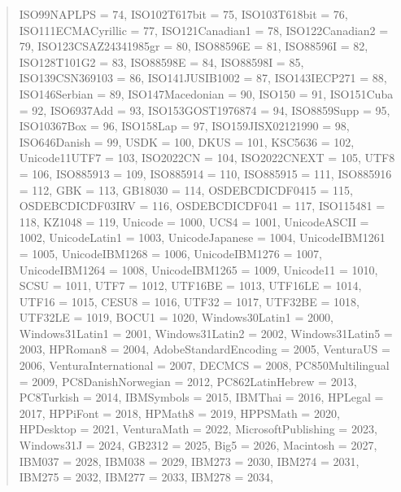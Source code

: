 \documentclass{wg21}
\begin{document}
\begin{quote}
\begin{addedblock}
\begin{codeblock}
{{{        ISO99NAPLPS = 74,
        ISO102T617bit = 75,
        ISO103T618bit = 76,
        ISO111ECMACyrillic = 77,
        ISO121Canadian1 = 78,
        ISO122Canadian2 = 79,
        ISO123CSAZ24341985gr = 80,
        ISO88596E = 81,
        ISO88596I = 82,
        ISO128T101G2 = 83,
        ISO88598E = 84,
        ISO88598I = 85,
        ISO139CSN369103 = 86,
        ISO141JUSIB1002 = 87,
        ISO143IECP271 = 88,
        ISO146Serbian = 89,
        ISO147Macedonian = 90,
        ISO150 = 91,
        ISO151Cuba = 92,
        ISO6937Add = 93,
        ISO153GOST1976874 = 94,
        ISO8859Supp = 95,
        ISO10367Box = 96,
        ISO158Lap = 97,
        ISO159JISX02121990 = 98,
        ISO646Danish = 99,
        USDK = 100,
        DKUS = 101,
        KSC5636 = 102,
        Unicode11UTF7 = 103,
        ISO2022CN = 104,
        ISO2022CNEXT = 105,
        UTF8 = 106,
        ISO885913 = 109,
        ISO885914 = 110,
        ISO885915 = 111,
        ISO885916 = 112,
        GBK = 113,
        GB18030 = 114,
        OSDEBCDICDF0415 = 115,
        OSDEBCDICDF03IRV = 116,
        OSDEBCDICDF041 = 117,
        ISO115481 = 118,
        KZ1048 = 119,
        Unicode = 1000,
        UCS4 = 1001,
        UnicodeASCII = 1002,
        UnicodeLatin1 = 1003,
        UnicodeJapanese = 1004,
        UnicodeIBM1261 = 1005,
        UnicodeIBM1268 = 1006,
        UnicodeIBM1276 = 1007,
        UnicodeIBM1264 = 1008,
        UnicodeIBM1265 = 1009,
        Unicode11 = 1010,
        SCSU = 1011,
        UTF7 = 1012,
        UTF16BE = 1013,
        UTF16LE = 1014,
        UTF16 = 1015,
        CESU8 = 1016,
        UTF32 = 1017,
        UTF32BE = 1018,
        UTF32LE = 1019,
        BOCU1 = 1020,
        Windows30Latin1 = 2000,
        Windows31Latin1 = 2001,
        Windows31Latin2 = 2002,
        Windows31Latin5 = 2003,
        HPRoman8 = 2004,
        AdobeStandardEncoding = 2005,
        VenturaUS = 2006,
        VenturaInternational = 2007,
        DECMCS = 2008,
        PC850Multilingual = 2009,
        PC8DanishNorwegian = 2012,
        PC862LatinHebrew = 2013,
        PC8Turkish = 2014,
        IBMSymbols = 2015,
        IBMThai = 2016,
        HPLegal = 2017,
        HPPiFont = 2018,
        HPMath8 = 2019,
        HPPSMath = 2020,
        HPDesktop = 2021,
        VenturaMath = 2022,
        MicrosoftPublishing = 2023,
        Windows31J = 2024,
        GB2312 = 2025,
        Big5 = 2026,
        Macintosh = 2027,
        IBM037 = 2028,
        IBM038 = 2029,
        IBM273 = 2030,
        IBM274 = 2031,
        IBM275 = 2032,
        IBM277 = 2033,
        IBM278 = 2034,
}}}
\end{codeblock}
\end{addedblock}
\end{quote}
\end{document}
